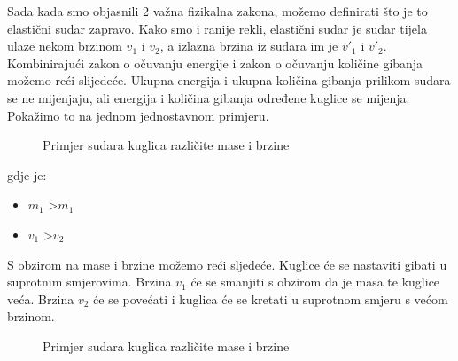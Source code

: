 Sada kada smo objasnili 2 važna fizikalna zakona, možemo definirati što je to elastični sudar zapravo. Kako smo i ranije rekli, elastični sudar je sudar tijela ulaze nekom brzinom $v_{1}$ i $v_{2}$, a izlazna brzina iz sudara im je $v'_{1}$ i $v'_{2}$. Kombinirajući zakon o očuvanju energije i zakon o očuvanju količine gibanja možemo reći slijedeće. Ukupna energija i ukupna količina gibanja prilikom sudara se ne mijenjaju, ali energija i količina gibanja određene kuglice se mijenja\cite{13}. Pokažimo to na jednom jednostavnom primjeru.
\begin{figure}[!http]
	\begin{center}
	\end{center}
	\caption {Primjer sudara kuglica različite mase i brzine}
	\label{fig:23}
\end{figure}
\newline
gdje je:
\begin{itemize}
	\item $m_{1}$ \textgreater$m_{1}$
	\item $v_{1}$ \textgreater $v_{2}$
\end{itemize}
S obzirom na mase i brzine možemo reći sljedeće. Kuglice će se nastaviti gibati u suprotnim smjerovima. Brzina $v_{1}$ će se smanjiti s obzirom da je masa te kuglice veća. Brzina $v_{2}$ će se povećati i kuglica će se kretati u suprotnom smjeru s većom brzinom.\newpage
\begin{figure}[!http]
	\begin{center}
	\end{center}
	\caption {Primjer sudara kuglica različite mase i brzine}
	\label{fig:24}
\end{figure} 
